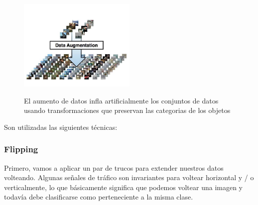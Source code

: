 	\begin{figure}[H]
	\begin{center}
	\includegraphics[width=0.5\textwidth ]{images/desarrollo/Augment/exampleaug}
	\end{center}
	\begin{center}
	\caption{\small{El aumento de datos infla artificialmente los conjuntos de datos usando transformaciones que preservan las categorias de los objetos}}
	{\small{\citep{DL_augmentData}}}
	\end{center}
	\vspace{-1.5em}
	\end{figure}


	Son utilizadas las siguientes técnicas:
	
	
	\subsubsection{Flipping}
	
	Primero, vamos a aplicar un par de trucos para extender nuestros datos volteando. Algunas señales de tráfico son invariantes para voltear horizontal y / o verticalmente, lo que básicamente significa que podemos voltear una imagen y todavía debe clasificarse como perteneciente a la misma clase.
	
